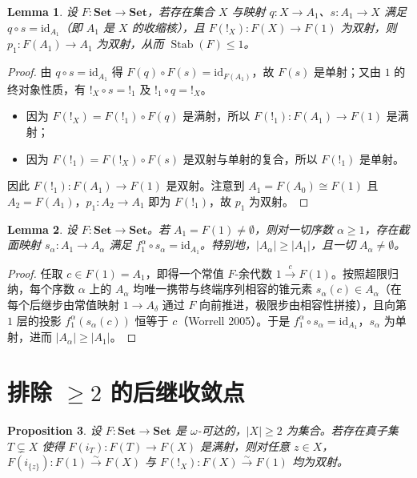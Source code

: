 \documentclass[11pt,a4paper]{ctexart}
\theoremstyle{plain}
\newtheorem{lemma}{Lemma}[section]
\newtheorem{proposition}[lemma]{Proposition}
\newcommand{\Stab}{\operatorname{Stab}}
\newcommand{\id}{\mathrm{id}}
\newcommand{\Set}{\mathbf{Set}}
\begin{document}
\begin{lemma}
设 $F : \Set \to \Set$，若存在集合 $X$ 与映射 $q : X \to A_1$、$s : A_1 \to X$ 满足 $q \circ s = \id_{A_1}$（即 $A_1$ 是 $X$ 的收缩核），且 $F({!}_X) : F(X) \to F(1)$ 为双射，则 $p_1 : F(A_1) \to A_1$ 为双射，从而 $\Stab(F) \le 1$。
\end{lemma}

\begin{proof}
由 $q \circ s = \id_{A_1}$ 得 $F(q) \circ F(s) = \id_{F(A_1)}$，故 $F(s)$ 是单射；又由 $1$ 的终对象性质，有 ${!}_X \circ s = {!}_1$ 及 ${!}_1 \circ q = {!}_X$。
\begin{itemize}[leftmargin=2em]
  \item 因为 $F(!_X) = F(!_1) \circ F(q)$ 是满射，所以 $F(!_1) : F(A_1) \to F(1)$ 是满射；
  \item 因为 $F(!_1) = F(!_X) \circ F(s)$ 是双射与单射的复合，所以 $F(!_1)$ 是单射。
\end{itemize}
因此 $F(!_1) : F(A_1) \to F(1)$ 是双射。注意到 $A_1 = F(A_0) \cong F(1)$ 且 $A_2 = F(A_1)$，$p_1 : A_2 \to A_1$ 即为 $F(!_1)$，故 $p_1$ 为双射。
\end{proof}

\begin{lemma}
设 $F : \Set \to \Set$。若 $A_1 = F(1) \neq \emptyset$，则对一切序数 $\alpha \ge 1$，存在截面映射 $s_\alpha : A_1 \to A_\alpha$ 满足 $f_1^\alpha \circ s_\alpha = \id_{A_1}$。特别地，$|A_\alpha| \ge |A_1|$，且一切 $A_\alpha \neq \emptyset$。
\end{lemma}

\begin{proof}
任取 $c \in F(1) = A_1$，即得一个常值 $F$-余代数 $1 \xrightarrow{c} F(1)$。按照超限归纳，每个序数 $\alpha$ 上的 $A_\alpha$ 均唯一携带与终端序列相容的锥元素 $s_\alpha(c) \in A_\alpha$（在每个后继步由常值映射 $1 \to A_\delta$ 通过 $F$ 向前推进，极限步由相容性拼接），且向第 $1$ 层的投影 $f_1^\alpha(s_\alpha(c))$ 恒等于 $c$（Worrell 2005）。于是 $f_1^\alpha \circ s_\alpha = \id_{A_1}$，$s_\alpha$ 为单射，进而 $|A_\alpha| \ge |A_1|$。
\end{proof}

\section{排除 $\ge 2$ 的后继收敛点}

\begin{proposition}
设 $F : \Set \to \Set$ 是 $\omega$-可达的，$|X| \ge 2$ 为集合。若存在真子集 $T \subsetneq X$ 使得 $F(i_T) : F(T) \to F(X)$ 是满射，则对任意 $z \in X$，$F(i_{\{z\}}) : F(1) \xrightarrow{\sim} F(X)$ 与 $F({!}_X) : F(X) \xrightarrow{\sim} F(1)$ 均为双射。
\end{proposition}
\end{document}
